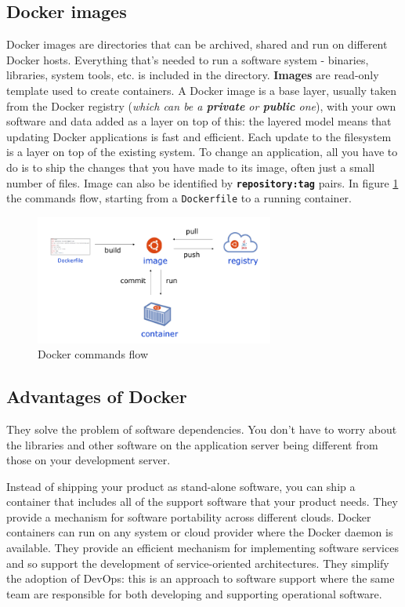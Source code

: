 \documentclass[10pt,a4paper]{report}
\begin{document}
\subsection{Docker images}
Docker images are directories that can be archived, shared and run on different Docker hosts. Everything that’s needed to run a software system - binaries, libraries, system tools, etc. is included in the directory. \textbf{Images} are read-only template used to create containers.
A Docker image is a base layer, usually taken from the Docker registry (\textit{which can be a \textbf{private} or \textbf{public} one}), with your own software and data added as a layer on top of this: the layered model means that updating Docker applications is fast and efficient.
Each update to the filesystem is a layer on top of the existing system. To change an application, all you have to do is to ship the changes that you have made to its image, often just a small number of files. Image can also be identified by \textbf{\texttt{repository:tag}} pairs. 
In figure \ref{image53} the commands flow, starting from a \texttt{Dockerfile} to a running container. 

   \begin{figure}[h]
	\centering
	\includegraphics[width=0.7\textwidth]{image53}
	\caption{Docker commands flow}
	\label{image53}
\end{figure}

\subsection{Advantages of Docker}
They solve the problem of software dependencies. You don’t have to worry about the libraries and other software on the application server being different from those on your development server.

Instead of shipping your product as stand-alone software, you can ship a container that includes all of the support software that your product needs.
They provide a mechanism for software portability across different clouds. Docker containers can run on any system or cloud provider where the Docker daemon is available.
They provide an efficient mechanism for implementing software services and so support the development of service-oriented architectures.
They simplify the adoption of DevOps: this is an approach to software support where the same team are responsible for both developing and supporting operational software.
\end{document}
